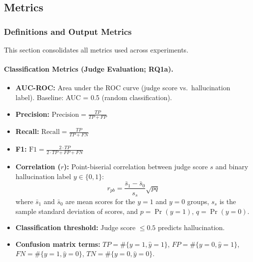 \subsection{Metrics}

\subsubsection{Definitions and Output Metrics}
\label{sec:metrics_definitions}

This section consolidates all metrics used across experiments.

\paragraph{Classification Metrics (Judge Evaluation; RQ1a).}
\begin{itemize}[noitemsep]
    \item \textbf{AUC-ROC:} Area under the ROC curve (judge score vs.\ hallucination label). Baseline: AUC = 0.5 (random classification).
    \item \textbf{Precision:} $\mathrm{Precision}=\frac{TP}{TP+FP}$
    \item \textbf{Recall:} $\mathrm{Recall}=\frac{TP}{TP+FN}$
    \item \textbf{F1:} $\mathrm{F1}=\frac{2\cdot TP}{2\cdot TP+FP+FN}$
    \item \textbf{Correlation ($r$):} Point-biserial correlation between judge score $s$ and binary hallucination label $y\in\{0,1\}$:
    \begin{equation}
        r_{pb}=\frac{\bar{s}_1-\bar{s}_0}{s_s}\sqrt{pq}
    \end{equation}
    where $\bar{s}_1$ and $\bar{s}_0$ are mean scores for the $y{=}1$ and $y{=}0$ groups, $s_s$ is the sample standard deviation of scores, and $p=\Pr(y{=}1)$, $q=\Pr(y{=}0)$.
    \item \textbf{Classification threshold:} Judge score $\leq 0.5$ predicts hallucination.
    \item \textbf{Confusion matrix terms:} $TP=\#\{y{=}1,\hat{y}{=}1\}$, $FP=\#\{y{=}0,\hat{y}{=}1\}$, $FN=\#\{y{=}1,\hat{y}{=}0\}$, $TN=\#\{y{=}0,\hat{y}{=}0\}$.
\end{itemize}

